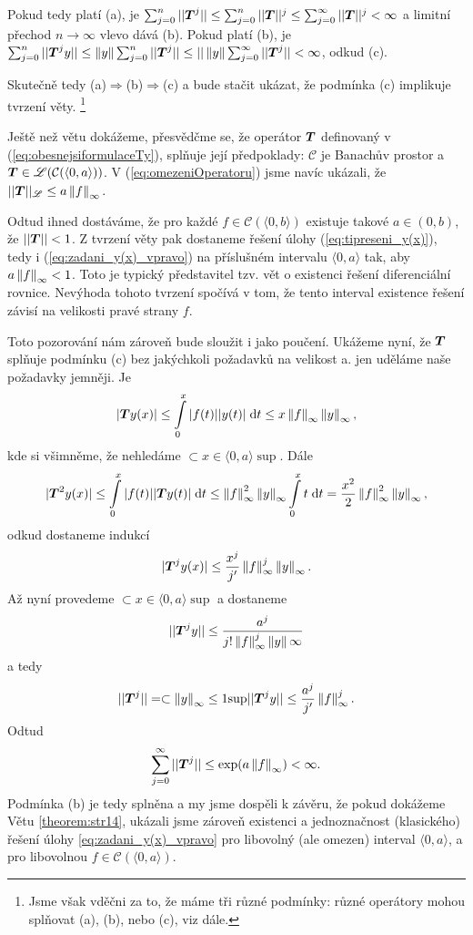Pokud tedy platí (a), je $\sum_{j=0}^n|| \boldsymbol{T} ^j||\leq\sum_{j=0}^n|| \boldsymbol{T} ||^j\leq \sum_{j=0}^\infty|| \boldsymbol{T} ||^j<\infty$ a limitní přechod $n\rightarrow \infty$ vlevo dává (b). Pokud platí (b), je $\sum_{j=0}^n|| \boldsymbol{T} ^jy||\leq\left\lVert y\right\rVert\sum_{j=0}^n|| \boldsymbol{T} ^j||\leq||\left\lVert y\right\rVert\sum_{j=0}^\infty|| \boldsymbol{T} ^j||<\infty$, odkud (c).

Skutečně tedy (a)$\Rightarrow$(b)$\Rightarrow$(c) a bude stačit ukázat, že podmínka (c) implikuje tvrzení věty. \footnote{Jsme však vděčni za to, že máme tři různé podmínky: různé operátory mohou splňovat (a), (b), nebo (c), viz dále.}
\item Ještě než větu dokážeme, přesvědčme se, že operátor $ \boldsymbol{T} $ definovaný v (\ref{eq:obesnejsiformulaceTy}), splňuje její předpoklady: $\mathcal{C}$ je Banachův prostor a $ \boldsymbol{T} \in\mathscr{L}(\mathcal{C}(\langle0,a\rangle))$. V (\ref{eq:omezeniOperatoru}) jsme navíc ukázali, že $|| \boldsymbol{T} ||_{\mathscr{L}}\leq a\left\lVert f\right\rVert_\infty.$

Odtud ihned dostáváme, že pro každé $f\in\mathcal{C}(\langle 0,b \rangle )$ existuje takové
$a\in (0,b)$, že $|| \boldsymbol{T} ||<1$.
Z tvrzení věty pak dostaneme  řešení úlohy (\ref{eq:tipreseni_y(x)}), tedy i (\ref{eq:zadani_y(x)_vpravo}) na příslušném  intervalu $\langle 0,a\rangle$
tak, aby $a\left\lVert f\right\rVert_\infty<1$. Toto je typický představitel tzv. vět o  existenci řešení diferenciální rovnice. Nevýhoda tohoto tvrzení spočívá v tom, že tento interval existence řešení závisí na velikosti pravé strany $f$.

Toto pozorování nám zároveň bude sloužit i jako poučení. Ukážeme nyní, že $ \boldsymbol{T} $ splňuje podmínku (c) bez jakýchkoli požadavků na velikost a. jen uděláme naše požadavky jemněji. Je 
$$| \boldsymbol{T} y(x)|\leq \int\limits_0^x|f(t)||y(t)|\;\mathrm{d}t\leq x\left\lVert f\right\rVert_\infty\left\lVert y\right\rVert_\infty,$$
kde si všimněme, že nehledáme $\subset{x\in\langle0,a\rangle}{\sup}$. Dále
$$| \boldsymbol{T} ^2y(x)|\leq\int\limits_0^x|f(t)|| \boldsymbol{T} y(t)|\;\mathrm{d}t\leq \left\lVert f\right\rVert^2_\infty\left\lVert y\right\rVert_\infty\int\limits_0^xt\;\mathrm{d}t = \frac{x^2}{2}\left\lVert f\right\rVert^2_\infty\left\lVert y\right\rVert_\infty,$$
odkud dostaneme indukcí
$$| \boldsymbol{T} ^jy(x)|\leq\frac{x^j}{j'}\left\lVert f\right\rVert^j_\infty\left\lVert y\right\rVert_\infty.$$
Až nyní provedeme $\subset{x\in\langle0,a\rangle}{\sup}$ a dostaneme 
$$|| \boldsymbol{T} ^jy||\leq\frac{a^j}{j!\left\lVert f\right\rVert^j_\infty\left\lVert y\right\rVert\infty}$$ a tedy 
$$|| \boldsymbol{T} ^j||=\subset{\left\lVert y\right\rVert_\infty\leq 1}{\sup}|| \boldsymbol{T} ^jy||\leq\frac{a^j}{j'}\left\lVert f\right\rVert^j_\infty.$$
Odtud $$\sum\limits_{j=0}^\infty|| \boldsymbol{T} ^j||\leq\exp(a\left\lVert f\right\rVert_\infty)<\infty.$$
Podmínka (b) je tedy splněna a my jsme dospěli k závěru, že pokud dokážeme Větu \ref{theorem:str14}, ukázali jsme zároveň existenci a jednoznačnost (klasického) řešení úlohy \ref{eq:zadani_y(x)_vpravo} pro libovolný (ale omezen) interval $\langle0,a\rangle$, a pro libovolnou $f\in\mathcal{C}(\langle0,a\rangle)$.

